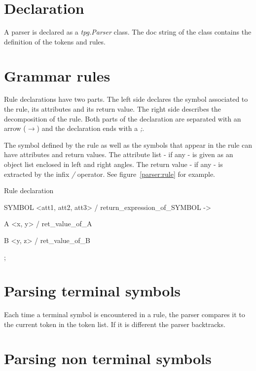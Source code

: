 \section{Declaration}

A parser is declared as a \emph{tpg.Parser} class.
The doc string of the class contains the definition of the tokens and rules.

\section{Grammar rules}											\label{parser:grammar_rules}

Rule declarations have two parts.
The left side declares the symbol associated to the rule, its attributes and its return value.
The right side describes the decomposition of the rule.
Both parts of the declaration are separated with an arrow (\emph{$\to$})
and the declaration ends with a \emph{;}.

The symbol defined by the rule as well as the symbols that appear in the rule can have attributes and return values.
The attribute list - if any - is given as an object list enclosed in left and right angles.
The return value - if any - is extracted by the infix \emph{/} operator.
See figure~\ref{parser:rule} for example.

\begin{code}
\caption{Rule declaration}										\label{parser:rule}
\begin{verbatimtab}[4]
	SYMBOL <att1, att2, att3> / return_expression_of_SYMBOL ->

		A <x, y> / ret_value_of_A

		B <y, z> / ret_value_of_B

		;
\end{verbatimtab}
\end{code}

\section{Parsing terminal symbols}

Each time a terminal symbol is encountered in a rule, the parser compares it to the current token in the token list. If it is different the parser backtracks.

\section{Parsing non terminal symbols}							\label{parser:nterm}

